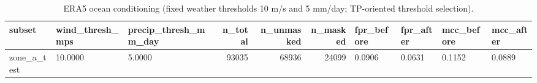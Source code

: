 \begin{table}
\caption{ERA5 ocean conditioning (fixed weather thresholds 10 m/s and 5 mm/day; TP-oriented threshold selection).}
\label{tab:tableS7}
\begin{tabular}{lllrrrllll}
\toprule
subset & wind\_thresh\_mps & precip\_thresh\_mm\_day & n\_total & n\_unmasked & n\_masked & fpr\_before & fpr\_after & mcc\_before & mcc\_after \\
\midrule
zone\_a\_test & 10.0000 & 5.0000 & 93035 & 68936 & 24099 & 0.0906 & 0.0631 & 0.1152 & 0.0889 \\
\bottomrule
\end{tabular}
\end{table}
